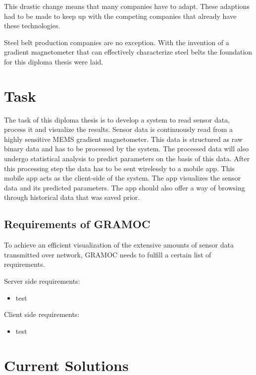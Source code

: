 
This drastic change means that many companies have to adapt. These adaptions had to be made to keep up with the competing companies that already have these technologies.

Steel belt production companies are no exception. With the invention of a gradient magnetometer that can effectively characterize steel belts the foundation for this diploma thesis were laid.


\section{Task}

The task of this diploma thesis is to develop a system to read sensor data, process it and visualize the results. Sensor data is continuously read from a highly sensitive MEMS gradient magnetometer. This data is structured as raw binary data and has to be processed by the system. The processed data will also undergo statistical analysis to predict parameters on the basis of this data. After this processing step the data has to be sent wirelessly to a mobile app. This mobile app acts as the client-side of the system. The app visualizes the sensor data and its predicted parameters. The app should also offer a way of browsing through historical data that was saved prior.


\subsection{Requirements of GRAMOC}
To achieve an efficient visualization of the extensive amounts of sensor data transmitted over network, GRAMOC needs to fulfill a certain list of requirements.

Server side requirements:

\begin{itemize}
    \item test
\end{itemize}


Client side requirements:

\begin{itemize}
    \item test
\end{itemize}

\section{Current Solutions}


